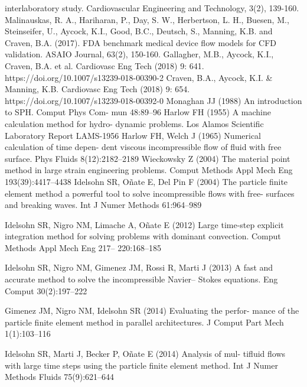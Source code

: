 interlaboratory study. Cardiovascular Engineering and Technology, 3(2), 139-160.
 Malinauskas, R. A., Hariharan, P., Day, S. W., Herbertson, L. H., Buesen, M., Steinseifer, U., Aycock, K.I., Good, B.C., Deutsch,
S., Manning, K.B. and Craven, B.A. (2017). FDA benchmark medical device flow models for CFD validation. ASAIO Journal,
63(2), 150-160.
 Gallagher, M.B., Aycock, K.I., Craven, B.A. et al. Cardiovasc Eng Tech (2018) 9: 641. https://doi.org/10.1007/s13239-018-00390-2
 Craven, B.A., Aycock, K.I. \& Manning, K.B. Cardiovasc Eng Tech (2018) 9: 654. https://doi.org/10.1007/s13239-018-00392-0
 Monaghan JJ (1988) An introduction to SPH. Comput Phys Com-
mun 48:89–96
 Harlow FH (1955) A machine calculation method for hydro-
dynamic problems. Los Alamos Scientific Laboratory Report
LAMS-1956
 Harlow FH, Welch J (1965) Numerical calculation of time depen-
dent viscous incompressible flow of fluid with free surface. Phys
Fluids 8(12):2182–2189
 Wieckowsky Z (2004) The material point method in large
strain engineering problems. Comput Methods Appl Mech Eng
193(39):4417–4438
 Idelsohn SR, Oñate E, Del Pin F (2004) The particle finite element
method a powerful tool to solve incompressible flows with free-
surfaces and breaking waves. Int J Numer Methods 61:964–989

 Idelsohn SR, Nigro NM, Limache A, Oñate E (2012) Large
time-step explicit integration method for solving problems with
dominant convection. Comput Methods Appl Mech Eng 217–
220:168–185

 Idelsohn SR, Nigro NM, Gimenez JM, Rossi R, Marti J (2013)
A fast and accurate method to solve the incompressible Navier–
Stokes equations. Eng Comput 30(2):197–222

 Gimenez JM, Nigro NM, Idelsohn SR (2014) Evaluating the perfor-
mance of the particle finite element method in parallel architectures.
J Comput Part Mech 1(1):103–116

 Idelsohn SR, Marti J, Becker P, Oñate E (2014) Analysis of mul-
tifluid flows with large time steps using the particle finite element
method. Int J Numer Methods Fluids 75(9):621–644

